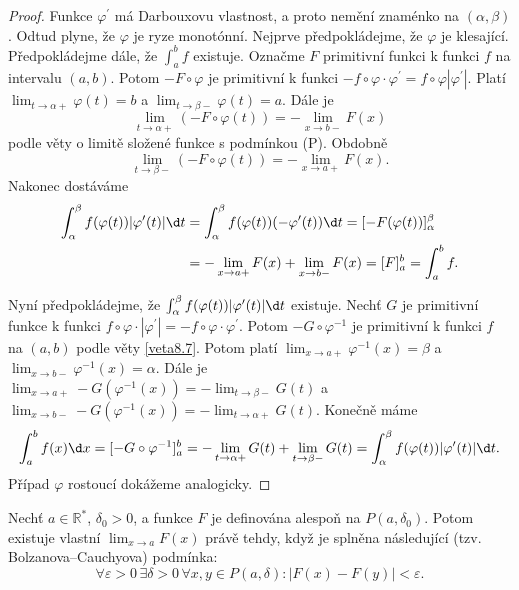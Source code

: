 \begin{proof}
	Funkce $\varphi^\prime$ má Darbouxovu vlastnost, a proto nemění znaménko na $(\alpha,\beta)$.
	Odtud plyne, že $\varphi$ je ryze monotónní. Nejprve předpokládejme, že $\varphi$ je klesající.
	Předpokládejme dále, že $\int_a^b f$ existuje. Označme $F$ primitivní funkci k funkci $f$ na intervalu
	$(a,b)$. Potom $-F\circ \varphi$ je primitivní k funkci $-f\circ \varphi \cdot \varphi^\prime=f\circ \varphi |\varphi^\prime|$.
	Platí $\lim_{t\to \alpha +} \varphi(t) = b$ a $\lim_{t\to \beta -}\varphi(t) = a$.
	Dále je
	$$
	\lim_{t\to \alpha+} (-F\circ\varphi(t))=-\lim_{x\to b-} F(x)
	$$
	podle věty o limitě složené funkce s podmínkou (P). Obdobně
	$$
 \lim_{t\to \beta-} (-F\circ\varphi(t))=-\lim_{x\to a+} F(x).
	$$
	Nakonec dostáváme
	\begin{align*}
	\int_\alpha^\beta f(\varphi(t))|\varphi^\prime (t)|\d t & = \int _\alpha ^\beta f(\varphi(t))(-\varphi^\prime(t))\d t = [-F(\varphi(t))]_\alpha ^\beta \\
	&= -\lim_{x\to a+} F(x) + \lim_{x\to b-} F(x) = [F]_a^b = \int_a^b f.
	\end{align*}
	\par Nyní předpokládejme, že $\int_\alpha^\beta f(\varphi(t))|\varphi^\prime(t)|\d t$ existuje. Nechť
	$G$ je primitivní funkce k funkci $f\circ \varphi \cdot |\varphi^\prime| = -f\circ \varphi \cdot\varphi^\prime$.
	Potom $-G\circ \varphi^{-1}$ je primitivní k funkci $f$ na $(a,b)$ podle věty \ref{veta8.7}.
	Potom platí $\lim_{x\to a+}\varphi^{-1}(x)=\beta$ a $\lim_{x\to b-}\varphi^{-1}(x)=\alpha$. Dále je
	$\lim_{x\to a+} -G(\varphi^{-1}(x))=-\lim_{t\to \beta-}G(t)$ a $\lim_{x\to b-}-G(\varphi^{-1}(x)) = -\lim_{t\to \alpha+} G(t)$.
	Konečně máme
	$$
	    \int_a^b f(x) \d x = [-G\circ \varphi^{-1}]_a^b = -\lim_{t\to \alpha+} G(t) + \lim_{t\to \beta -} G(t) = \int_\alpha^\beta f(\varphi(t)) |\varphi^\prime(t)|\d t.
	$$
	Případ $\varphi$ rostoucí dokážeme analogicky.
\end{proof}

\begin{veta}\label{veta8.32}
Nechť $a \in \mathbb{R}^*$, $\delta_0 > 0$, a funkce $F$ je definována alespoň na $P(a, \delta_0)$.
Potom existuje vlastní $\lim_{x \to a} F(x)$ právě tehdy, když je splněna následující (tzv. Bolzanova--Cauchyova) podmínka:
\[
\forall \varepsilon > 0 \, \exists \delta > 0 \, \forall x, y \in P(a, \delta): |F(x) - F(y)| < \varepsilon.
\]
\end{veta}

